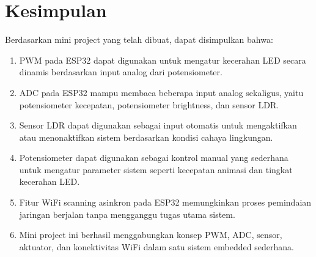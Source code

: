 \documentclass[12pt,a4paper]{article}
\begin{document}
\section{Kesimpulan}
Berdasarkan mini project yang telah dibuat, dapat disimpulkan bahwa:
\begin{enumerate}
    \item PWM pada ESP32 dapat digunakan untuk mengatur kecerahan LED secara dinamis berdasarkan input analog dari potensiometer.
    \item ADC pada ESP32 mampu membaca beberapa input analog sekaligus, yaitu potensiometer kecepatan, potensiometer brightness, dan sensor LDR.
    \item Sensor LDR dapat digunakan sebagai input otomatis untuk mengaktifkan atau menonaktifkan sistem berdasarkan kondisi cahaya lingkungan.
    \item Potensiometer dapat digunakan sebagai kontrol manual yang sederhana untuk mengatur parameter sistem seperti kecepatan animasi dan tingkat kecerahan LED.
    \item Fitur WiFi scanning asinkron pada ESP32 memungkinkan proses pemindaian jaringan berjalan tanpa mengganggu tugas utama sistem.
    \item Mini project ini berhasil menggabungkan konsep PWM, ADC, sensor, aktuator, dan konektivitas WiFi dalam satu sistem embedded sederhana.
\end{enumerate}
\end{document}
